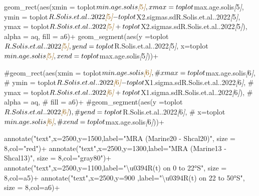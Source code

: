 \documentclass[
]{article}
\newenvironment{Shaded}{\begin{snugshade}}{\end{snugshade}}
\newcommand{\CommentTok}[1]{\textcolor[rgb]{0.56,0.35,0.01}{\textit{#1}}}
\newcommand{\NormalTok}[1]{#1}
\newcommand{\OtherTok}[1]{\textcolor[rgb]{0.56,0.35,0.01}{#1}}
\begin{document}
\begin{Shaded}
\begin{Highlighting}[]
\NormalTok{  geom\_rect(aes(xmin = toplot$min.age.solis}\CommentTok{[}\OtherTok{5}\CommentTok{]}\NormalTok{, }
\NormalTok{                xmax = toplot$max.age.solis}\CommentTok{[}\OtherTok{5}\CommentTok{]}\NormalTok{, }
\NormalTok{                ymin = toplot$R.Solis.et.al..2022}\CommentTok{[}\OtherTok{5}\CommentTok{]}\NormalTok{{-}toplot$X2.sigmas.sdR.Solis.et.al..2022}\CommentTok{[}\OtherTok{5}\CommentTok{]}\NormalTok{,}
\NormalTok{                ymax = toplot$R.Solis.et.al..2022}\CommentTok{[}\OtherTok{5}\CommentTok{]}\NormalTok{+toplot$X2.sigmas.sdR.Solis.et.al..2022}\CommentTok{[}\OtherTok{5}\CommentTok{]}\NormalTok{),}
\NormalTok{            alpha = aq,}
\NormalTok{            fill = a6)+}
\NormalTok{  geom\_segment(aes(y =toplot$R.Solis.et.al..2022}\CommentTok{[}\OtherTok{5}\CommentTok{]}\NormalTok{,}
\NormalTok{                   yend =toplot$R.Solis.et.al..2022}\CommentTok{[}\OtherTok{5}\CommentTok{]}\NormalTok{,}
\NormalTok{                   x=toplot$min.age.solis}\CommentTok{[}\OtherTok{5}\CommentTok{]}\NormalTok{,}
\NormalTok{                   xend=toplot$max.age.solis}\CommentTok{[}\OtherTok{5}\CommentTok{]}\NormalTok{))+}
  
\NormalTok{  \#geom\_rect(aes(xmin = toplot$min.age.solis}\CommentTok{[}\OtherTok{6}\CommentTok{]}\NormalTok{, }
\NormalTok{  \#              xmax = toplot$max.age.solis}\CommentTok{[}\OtherTok{6}\CommentTok{]}\NormalTok{, }
\NormalTok{  \#              ymin = toplot$R.Solis.et.al..2022}\CommentTok{[}\OtherTok{6}\CommentTok{]}\NormalTok{{-}toplot$X1.sigma.sdR.Solis.et.al..2022}\CommentTok{[}\OtherTok{6}\CommentTok{]}\NormalTok{,}
\NormalTok{  \#              ymax = toplot$R.Solis.et.al..2022}\CommentTok{[}\OtherTok{6}\CommentTok{]}\NormalTok{+toplot$X1.sigma.sdR.Solis.et.al..2022}\CommentTok{[}\OtherTok{6}\CommentTok{]}\NormalTok{),}
\NormalTok{  \#          alpha = aq,}
\NormalTok{  \#          fill = a6)+}
\NormalTok{  \#geom\_segment(aes(y =toplot$R.Solis.et.al..2022}\CommentTok{[}\OtherTok{6}\CommentTok{]}\NormalTok{),}
\NormalTok{   \#                yend =toplot$R.Solis.et.al..2022}\CommentTok{[}\OtherTok{6}\CommentTok{]}\NormalTok{,}
\NormalTok{    \#               x=toplot$min.age.solis}\CommentTok{[}\OtherTok{6}\CommentTok{]}\NormalTok{,}
\NormalTok{     \#              xend=toplot$max.age.solis}\CommentTok{[}\OtherTok{6}\CommentTok{]}\NormalTok{))+}

\NormalTok{  annotate("text",x=2500,y=1500,label="MRA (Marine20 {-} Shcal20)", size = 8,col="red")+}
\NormalTok{  annotate("text",x=2500,y=1300,label="MRA (Marine13 {-} Shcal13)", size = 8,col="gray80")+}
\NormalTok{  annotate("text",x=2500,y=1100,label="\textbackslash{}u0394R(t) on  0 to 22°S", size = 8,col=a5)+}
\NormalTok{  annotate("text",x=2500,y=900 ,label="\textbackslash{}u0394R(t) on 22 to 50°S", size = 8,col=a6)+}


\end{Highlighting}
\end{Shaded}
\end{document}
